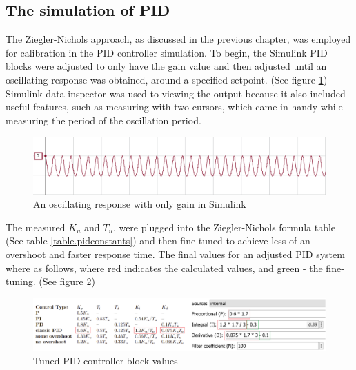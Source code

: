 \subsection{The simulation of PID}

The Ziegler-Nichols approach, as discussed in the previous chapter, was employed for calibration in the PID controller simulation. To begin, the Simulink PID blocks were adjusted to only have the gain value and then adjusted until an oscillating response was obtained, around a specified setpoint. (See figure \ref{fig:posc}) Simulink data inspector was used to viewing the output because it also included useful features, such as measuring with two cursors, which came in handy while measuring the period of the oscillation period.

\begin{figure}[H]
    \begin{center}
    \includegraphics[scale=0.75]{pictures/control/posc}
    \end{center}
    \caption{An oscillating response with only gain in Simulink}
    \label{fig:posc}
\end{figure}

The measured $K_u$ and $T_u$, were plugged into the Ziegler-Nichols formula table (See table \ref{table.pidconstants}) and then fine-tuned to achieve less of an overshoot and faster response time.
The final values for an adjusted PID system where as follows, where red indicates the calculated values, and green - the fine-tuning. (See figure \ref{fig:simpidvalues})

\begin{figure}[H]
    \begin{center}
    \includegraphics[scale=0.65]{pictures/control/simpidvalues}
    \end{center}
    \caption{Tuned PID controller block values}
    \label{fig:simpidvalues}
\end{figure}


